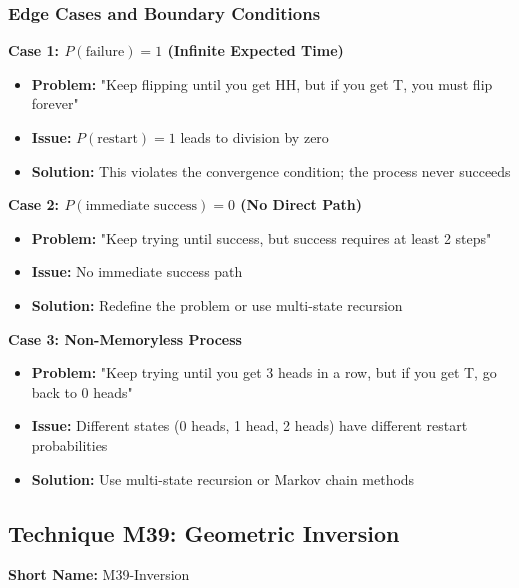 \documentclass[12pt]{article}
\begin{document}
\subsubsection{Edge Cases and Boundary Conditions}

\textbf{Case 1: $P(\text{failure}) = 1$ (Infinite Expected Time)}
\begin{itemize}
    \item \textbf{Problem:} "Keep flipping until you get HH, but if you get T, you must flip forever"
    \item \textbf{Issue:} $P(\text{restart}) = 1$ leads to division by zero
    \item \textbf{Solution:} This violates the convergence condition; the process never succeeds
\end{itemize}

\textbf{Case 2: $P(\text{immediate success}) = 0$ (No Direct Path)}
\begin{itemize}
    \item \textbf{Problem:} "Keep trying until success, but success requires at least 2 steps"
    \item \textbf{Issue:} No immediate success path
    \item \textbf{Solution:} Redefine the problem or use multi-state recursion
\end{itemize}

\textbf{Case 3: Non-Memoryless Process}
\begin{itemize}
    \item \textbf{Problem:} "Keep trying until you get 3 heads in a row, but if you get T, go back to 0 heads"
    \item \textbf{Issue:} Different states (0 heads, 1 head, 2 heads) have different restart probabilities
    \item \textbf{Solution:} Use multi-state recursion or Markov chain methods
\end{itemize}

\subsection{Technique M39: Geometric Inversion}
\textbf{Short Name:} M39-Inversion
\end{document}
